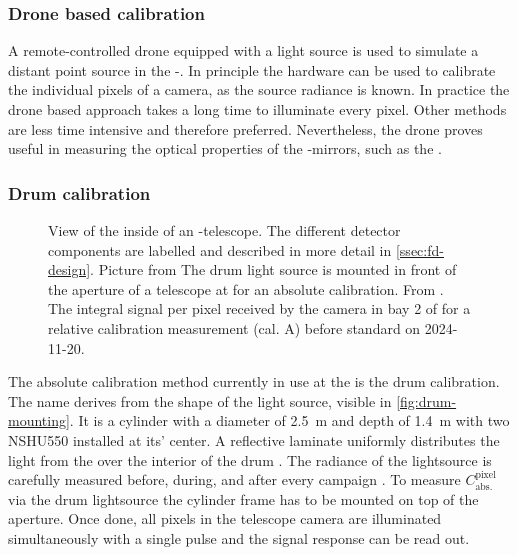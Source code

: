 \subsubsection{Drone based calibration}

A remote-controlled drone equipped with a light source is used to simulate a 
distant point source in the \FD-\FOV \cite{wernerDesignTestFlying2010, 
tomankovaOpticalPropertiesCalibration2016}. In principle the hardware can be
used to calibrate the individual pixels of a camera, as the source radiance is
known. In practice the drone based approach takes a long time to illuminate 
every pixel. Other methods are less time intensive and therefore preferred. 
Nevertheless, the drone proves useful in measuring the optical properties of 
the \FD-mirrors, such as the \PSF \cite{ungerSimulationPointSpread2013}.

\subsubsection{Drum calibration}

\begin{figure}[t]
  \centering
  \hspace{0.1cm}
  \hspace{0.1cm}
  \caption[]{ View of the inside of an \FD-telescope.
  The different detector components are labelled and described in more detail in
  \cref{ssec:fd-design}. Picture from \cite{pierreaugerobservatoryP22500022004} 
   The drum light source is mounted in front of the 
  aperture of a telescope at \CO for an absolute calibration. From 
  \cite{crissUpdateRecentAbsolute2010}.  The 
  integral signal per pixel received by the camera in bay 2 of \CO for a 
  relative calibration measurement (cal. A) before standard \DAQ on 2024-11-20.}
  \label{fig:camera-stuff}
\end{figure}

The absolute calibration method currently in use at the \PAO is the drum 
calibration. The name derives from the shape of the light source, visible in 
\cref{fig:drum-mounting}. It is a cylinder with a diameter of \SI{2.5}{\meter} 
and depth of \SI{1.4}{\meter} with two NSHU550 \UV \LEDs installed at its' 
center. A reflective laminate uniformly distributes the light from the \LED over
the interior of the drum \cite{brackAbsolutePhotometricCalibration2004}. The 
radiance of the lightsource is carefully measured before, during, and after 
every \DAQ campaign \cite{brackAugerFluorescenceDetector2013}. To measure 
$C^\mathrm{pixel}_\mathrm{abs.}$ via the drum lightsource the cylinder frame has
to be mounted on top of the \FD aperture. Once done, all pixels in the telescope
camera are illuminated simultaneously with a single \LED pulse and the signal
response can be read out.

